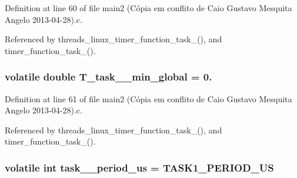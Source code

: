 Definition at line 60 of file main2 (\-Cópia em conflito de Caio Gustavo Mesquita Angelo 2013-\/04-\/28).\-c.



Referenced by threads\-\_\-linux\-\_\-timer\-\_\-function\-\_\-task\-\_(), and timer\-\_\-function\-\_\-task\-\_().

\hypertarget{main2_01_07C_xC3_xB3pia_01em_01conflito_01de_01Caio_01Gustavo_01Mesquita_01Angelo_012013-04-28_08_8c_ab7712cb13ce6206dd138a51e2053e36c}{
\subsubsection[{T\-\_\-task\-\_\-2\-\_\-min\-\_\-global}]{\setlength{\rightskip}{0pt plus 5cm}volatile double T\-\_\-task\-\_\-\_\-min\-\_\-global = 0.}}\label{main2_01_07C_xC3_xB3pia_01em_01conflito_01de_01Caio_01Gustavo_01Mesquita_01Angelo_012013-04-28_08_8c_ab7712cb13ce6206dd138a51e2053e36c}


Definition at line 61 of file main2 (\-Cópia em conflito de Caio Gustavo Mesquita Angelo 2013-\/04-\/28).\-c.



Referenced by threads\-\_\-linux\-\_\-timer\-\_\-function\-\_\-task\-\_(), and timer\-\_\-function\-\_\-task\-\_().

\hypertarget{main2_01_07C_xC3_xB3pia_01em_01conflito_01de_01Caio_01Gustavo_01Mesquita_01Angelo_012013-04-28_08_8c_afffc21b0b726e6f4a572d0eefd3b5d69}{
\subsubsection[{task\-\_\-1\-\_\-period\-\_\-us}]{\setlength{\rightskip}{0pt plus 5cm}volatile int task\-\_\-\_\-period\-\_\-us = {\bf T\-A\-S\-K1\-\_\-\-P\-E\-R\-I\-O\-D\-\_\-\-U\-S}}}\label{main2_01_07C_xC3_xB3pia_01em_01conflito_01de_01Caio_01Gustavo_01Mesquita_01Angelo_012013-04-28_08_8c_afffc21b0b726e6f4a572d0eefd3b5d69}


